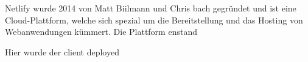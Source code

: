 Netlify wurde 2014 von Matt Biilmann und Chris bach gegründet und ist eine Cloud-Plattform, welche sich spezial um die Bereitstellung und das Hosting von Webanwendungen kümmert. Die Plattform enstand

Hier wurde der client deployed